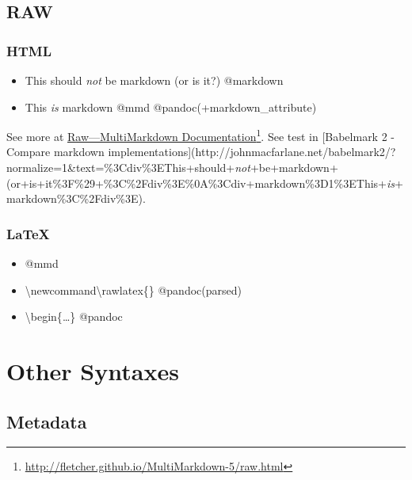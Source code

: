 \section{RAW}
\label{raw}

\subsection{HTML}
\label{html}

\begin{itemize}
\item This should \emph{not} be markdown (or is it?)  @markdown

\item This \emph{is} markdown @mmd @pandoc(+markdown\_attribute)

\end{itemize}

See more at \href{http://fletcher.github.io/MultiMarkdown-5/raw.html}{Raw---MultiMarkdown Documentation}\footnote{\href{http://fletcher.github.io/MultiMarkdown-5/raw.html}{http:/\slash fletcher.github.io\slash MultiMarkdown-5\slash raw.html}}. See test in [Babelmark 2 - Compare markdown implementations](http:\slash \slash johnmacfarlane.net\slash babelmark2\slash ?normalize=1\&text=\%3Cdiv\%3EThis+should+\emph{not}+be+markdown+(or+is+it\%3F\%29+\%3C\%2Fdiv\%3E\%0A\%3Cdiv+markdown\%3D1\%3EThis+\emph{is}+markdown\%3C\%2Fdiv\%3E).

\subsection{LaTeX}
\label{latex}

\begin{itemize}
\item  \newcommand\rawlatex{}  @mmd

\item \textbackslash{}newcommand\textbackslash{}rawlatex\{\} @pandoc(parsed)

\item \textbackslash{}begin\{{\ldots}\} @pandoc

\end{itemize}

\chapter{Other Syntaxes}
\label{othersyntaxes}

\section{Metadata}
\label{metadata}

